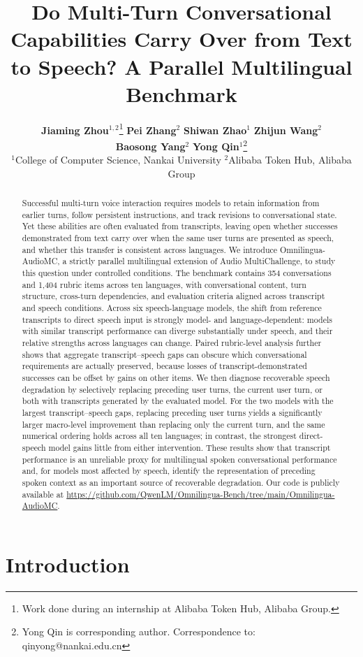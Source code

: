 \documentclass{article}
\title{Do Multi-Turn Conversational Capabilities Carry Over from Text to Speech? A Parallel Multilingual Benchmark}
\author{
\begin{tabular}{c}
\textbf{Jiaming Zhou}$^{1,2}$\thanks{Work done during an internship at Alibaba Token Hub, Alibaba Group.}
\quad
\textbf{Pei Zhang}$^{2}$
\quad
\textbf{Shiwan Zhao}$^{1}$
\quad
\textbf{Zhijun Wang}$^{2}$ \\ 
\quad
\textbf{Baosong Yang}$^{2}$ 
\quad
\textbf{Yong Qin}$^{1}$\thanks{Yong Qin is corresponding author. Correspondence to: qinyong@nankai.edu.cn} \\[1ex]
\quad
\normalfont $^1$College of Computer Science, Nankai University
\quad
$^2$Alibaba Token Hub, Alibaba Group
\end{tabular}
}
\begin{document}
\maketitle

\begin{abstract}
Successful multi-turn voice interaction requires models to retain information from earlier turns, follow persistent instructions, and track revisions to conversational state. Yet these abilities are often evaluated from transcripts, leaving open whether successes demonstrated from text carry over when the same user turns are presented as speech, and whether this transfer is consistent across languages. We introduce Omnilingua-AudioMC, a strictly parallel multilingual extension of Audio MultiChallenge, to study this question under controlled conditions. The benchmark contains 354 conversations and 1,404 rubric items across ten languages, with conversational content, turn structure, cross-turn dependencies, and evaluation criteria aligned across transcript and speech conditions. Across six speech-language models, the shift from reference transcripts to direct speech input is strongly model- and language-dependent: models with similar transcript performance can diverge substantially under speech, and their relative strengths across languages can change. Paired rubric-level analysis further shows that aggregate transcript--speech gaps can obscure which conversational requirements are actually preserved, because losses of transcript-demonstrated successes can be offset by gains on other items. We then diagnose recoverable speech degradation by selectively replacing preceding user turns, the current user turn, or both with transcripts generated by the evaluated model. For the two models with the largest transcript--speech gaps, replacing preceding user turns yields a significantly larger macro-level improvement than replacing only the current turn, and the same numerical ordering holds across all ten languages; in contrast, the strongest direct-speech model gains little from either intervention. These results show that transcript performance is an unreliable proxy for multilingual spoken conversational performance and, for models most affected by speech, identify the representation of preceding spoken context as an important source of recoverable degradation. Our code is publicly available at \url{https://github.com/QwenLM/Omnilingua-Bench/tree/main/Omnilingua-AudioMC}.
\end{abstract}


\section{Introduction}
\end{document}
